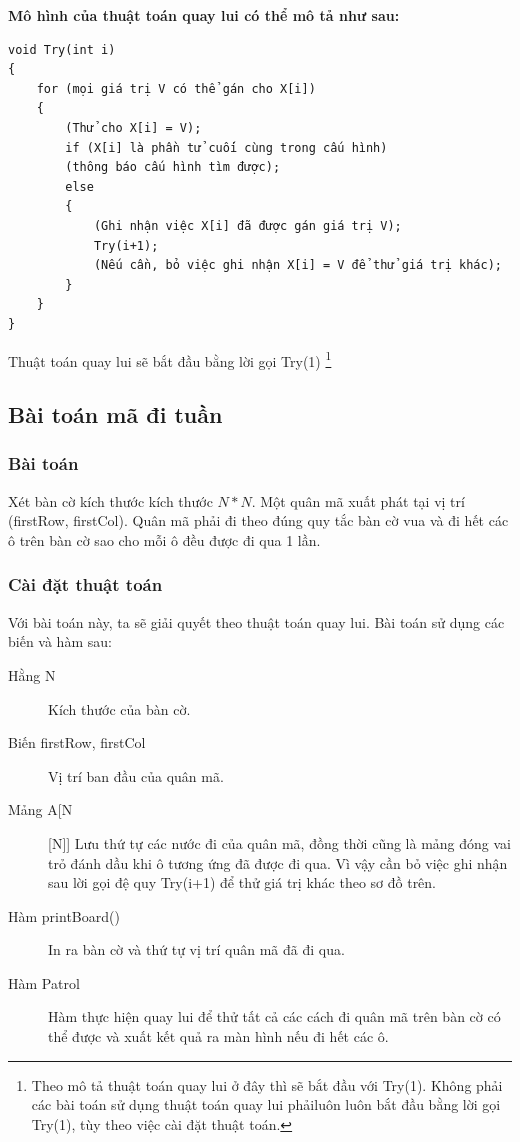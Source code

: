 \documentclass[8pt, a4paper]{article}
\begin{document}
\textbf{Mô hình của thuật toán quay lui có thể mô tả như sau:}

\begin{verbatim}
void Try(int i)
{
    for (mọi giá trị V có thể gán cho X[i])
    {
        (Thử cho X[i] = V);
        if (X[i] là phần tử cuối cùng trong cấu hình)
        (thông báo cấu hình tìm được);
        else
        {
            (Ghi nhận việc X[i] đã được gán giá trị V);
            Try(i+1);
            (Nếu cần, bỏ việc ghi nhận X[i] = V để thử giá trị khác);
        }
    }
}
\end{verbatim}

Thuật toán quay lui sẽ bắt đầu bằng lời gọi Try(1) \footnote{Theo mô tả thuật toán quay lui ở đây thì sẽ bắt đầu với Try(1). Không phải các bài toán sử dụng thuật toán quay lui phảiluôn luôn bắt đầu bằng lời gọi Try(1), tùy theo việc cài đặt thuật toán.}
\subsection{Bài toán mã đi tuần}

\subsubsection{Bài toán}

Xét bàn cờ kích thước kích thước $N*N$. Một quân mã xuất phát tại vị trí (firstRow, firstCol). Quân mã phải đi theo đúng quy tắc bàn cờ vua và đi hết các ô trên bàn cờ sao cho mỗi ô đều được đi qua 1 lần.

\subsubsection{Cài đặt thuật toán}

Với bài toán này, ta sẽ giải quyết theo thuật toán quay lui. Bài toán sử dụng các biến và hàm sau:

\begin{description}
\item [Hằng N] Kích thước của bàn cờ.
\item [Biến firstRow, firstCol] Vị trí ban đầu của quân mã.
\item [Mảng A[N][N]] Lưu thứ tự các nước đi của quân mã, đồng thời cũng là mảng đóng vai trỏ đánh dầu khi ô tương ứng đã được đi qua. Vì vậy cần bỏ việc ghi nhận sau lời gọi đệ quy Try(i+1) để thử giá trị khác theo sơ đồ trên.
\item [Hàm printBoard()] In ra bàn cờ và thứ tự vị trí quân mã đã đi qua.
\item [Hàm Patrol] Hàm thực hiện quay lui để thử tất cả các cách đi quân mã trên bàn cờ có thể được và xuất kết quả ra màn hình nếu đi hết các ô.
\end{description}
\end{document}

